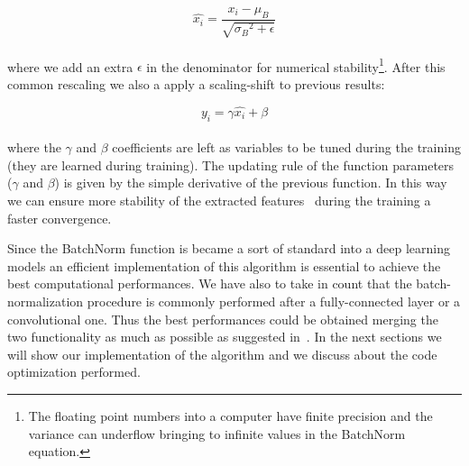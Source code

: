 \documentclass{standalone}
\begin{document}
$$
\hat{x_i} = \frac{x_i - \mu_B}{\sqrt{{\sigma_B}^2 + \epsilon}}
$$
\\
where we add an extra $\epsilon$ in the denominator for numerical stability\footnote{
  The floating point numbers into a computer have finite precision and the variance can underflow bringing to infinite values in the BatchNorm equation.
}.
After this common rescaling we also a apply a scaling-shift to previous results:

$$
y_i = \gamma\hat{x_i} + \beta
$$
\\
where the $\gamma$ and $\beta$ coefficients are left as variables to be tuned during the training (they are learned during training).
The updating rule of the function parameters ($\gamma$ and $\beta$) is given by the simple derivative of the previous function. %
In this way we can ensure more stability of the extracted features~\cite{Lecun2000EffBackProp} during the training a faster convergence.

Since the BatchNorm function is became a sort of standard into a deep learning models an efficient implementation of this algorithm is essential to achieve the best computational performances.
We have also to take in count that the batch-normalization procedure is commonly performed after a fully-connected layer or a convolutional one.
Thus the best performances could be obtained merging the two functionality as much as possible as suggested in~\cite{AlexeyAB}.
In the next sections we will show our implementation of the algorithm and we discuss about the code optimization performed.
\end{document}
